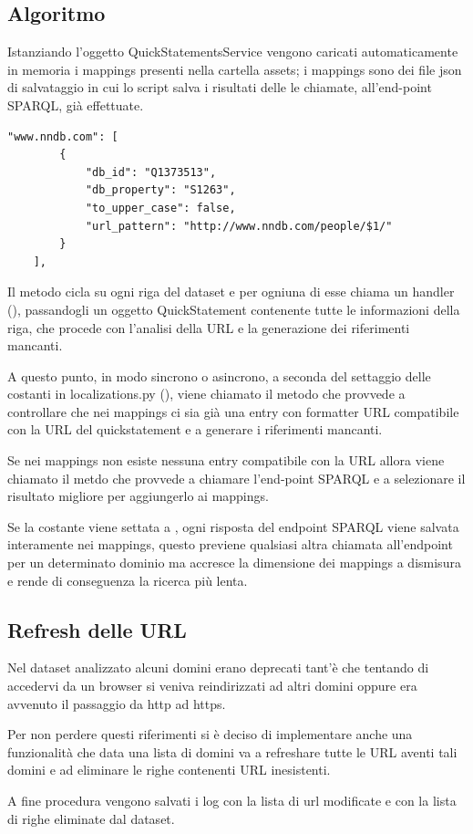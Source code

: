 \subsection{Algoritmo}
Istanziando l'oggetto QuickStatementsService vengono caricati automaticamente in memoria i mappings presenti nella cartella assets; 
i mappings sono dei file json di salvataggio in cui lo script salva i risultati delle le chiamate, all'end-point SPARQL, già effettuate.

\begin{lstlisting}[style=jsonStyle, caption=Some Code]
    "www.nndb.com": [
        {
            "db_id": "Q1373513", 
            "db_property": "S1263", 
            "to_upper_case": false, 
            "url_pattern": "http://www.nndb.com/people/$1/"
        }
    ], 
\end{lstlisting}

Il metodo  cicla su ogni riga del dataset e per ogniuna di esse chiama un handler (), passandogli un oggetto 
QuickStatement contenente tutte le informazioni della riga, che procede con l'analisi della URL e la generazione dei riferimenti mancanti.

A questo punto, in modo sincrono o asincrono, a seconda del settaggio delle costanti in localizations.py (), 
viene chiamato il metodo  che provvede a controllare che nei mappings ci sia già una entry con formatter URL compatibile 
con la URL del quickstatement e a generare i riferimenti mancanti.

Se nei mappings non esiste nessuna entry compatibile con la URL allora viene chiamato il metdo  che provvede a chiamare l'end-point SPARQL 
e a selezionare il risultato migliore per aggiungerlo ai mappings. 

Se la costante  viene settata a , ogni risposta del endpoint SPARQL viene salvata interamente nei mappings, questo previene qualsiasi altra chiamata all'endpoint 
per un determinato dominio ma accresce la dimensione dei mappings a dismisura e rende di conseguenza la ricerca più lenta.
 
\subsection{Refresh delle URL}
Nel dataset analizzato alcuni domini erano deprecati tant'è che tentando di accedervi da un browser si veniva reindirizzati ad altri domini oppure era avvenuto il passaggio da http ad https.

Per non perdere questi riferimenti si è deciso di implementare anche una funzionalità che data una lista di domini va a refreshare tutte le URL aventi tali domini e ad eliminare le 
righe contenenti URL inesistenti.

A fine procedura vengono salvati i log con la lista di url modificate e con la lista di righe eliminate dal dataset.

